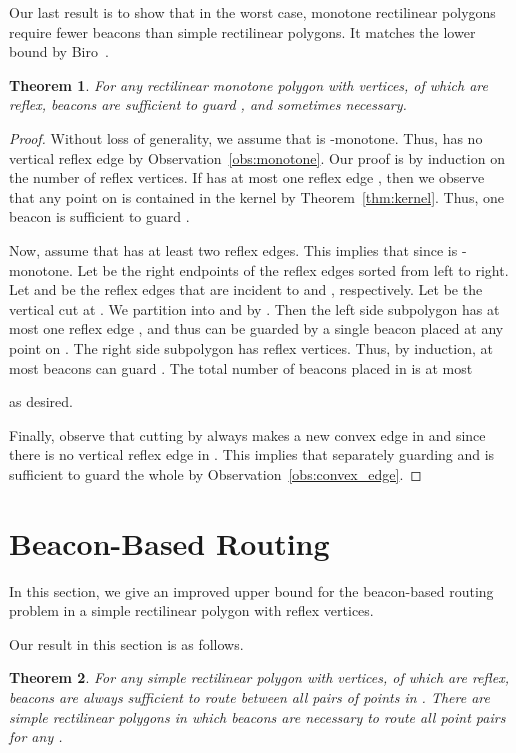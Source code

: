 \documentclass[11pt]{article}
\newtheorem{theorem}{Theorem}
\theoremstyle{definition}
\begin{document}
Our last result is to show that in the worst case, monotone rectilinear polygons require fewer
beacons than simple rectilinear polygons. It matches the lower bound by Biro~\cite{b-bbrg-13}.
\begin{theorem}\label{thm:coverage_monotone}
 For any rectilinear monotone polygon  with  vertices,  of which are reflex,
  beacons are sufficient to guard ,
 and sometimes necessary.
\end{theorem}
\begin{proof}
Without loss of generality, we assume that  is -monotone.
Thus,  has no vertical reflex edge by Observation~\ref{obs:monotone}.
Our proof is by induction on the number  of reflex vertices.
If  has at most one reflex edge ,
then we observe that any point on  is contained in the kernel 
by Theorem~\ref{thm:kernel}.
Thus, one beacon is sufficient to guard .

Now, assume that  has at least two reflex edges.
This implies that  since  is -monotone.
Let  be the right endpoints of the reflex edges
sorted from left to right.
Let  and  be the reflex edges that are incident to  and , respectively.
Let  be the vertical cut at .
We partition  into  and  by .
Then the left side subpolygon  has at most one reflex edge ,
and thus can be guarded by a single beacon placed at any point on .
The right side subpolygon  has  reflex vertices.
Thus, by induction, at most  beacons
can guard .
The total number of beacons placed in  is at most
 
as desired.

Finally, observe that cutting by  always makes a new convex edge in  and 
since there is no vertical reflex edge in .
This implies that separately guarding  and  is sufficient to guard the whole 
by Observation~\ref{obs:convex_edge}.
\end{proof}

\section{Beacon-Based Routing} \label{sec:routing}


In this section, we give an improved upper bound for the beacon-based routing problem in a simple rectilinear polygon  with  reflex vertices. 

Our result in this section is as follows.
\begin{theorem}
\label{thm:routing}
 For any simple rectilinear polygon  with  vertices,  of which are reflex,
  beacons are always sufficient
 to route between all pairs of points in . There are simple rectilinear polygons in which  beacons are necessary to route all point pairs for any .
\end{theorem}
\end{document}
